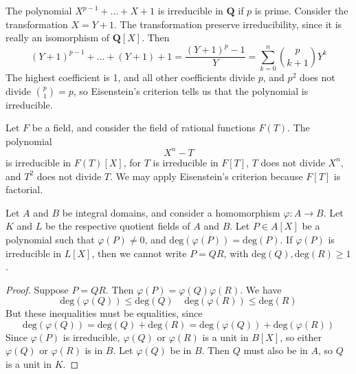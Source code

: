 \begin{example}
    The polynomial $X^{p-1} + \dots + X + 1$ is irreducible in $\mathbf{Q}$ if $p$ is prime. Consider the transformation $X = Y + 1$. The transformation preserve irreducibility, since it is really an isomorphism of $\mathbf{Q}[X]$. Then
    \[ (Y + 1)^{p-1} + \dots + (Y + 1) + 1 = \frac{(Y + 1)^p - 1}{Y} = \sum_{k = 0}^n \binom{p}{k+1} Y^k \]
    The highest coefficient is 1, and all other coefficients divide $p$, and $p^2$ does not divide $\binom{p}{1} = p$, so Eisenstein's criterion tells us that the polynomial is irreducible.
\end{example}

\begin{example}
    Let $F$ be a field, and consider the field of rational functions $F(T)$. The polynomial
    \[ X^n - T \]
    is irreducible in $F(T)[X]$, for $T$ is irreducible in $F[T]$, $T$ does not divide $X^n$, and $T^2$ does not divide $T$. We may apply Eisenstein's criterion because $F[T]$ is factorial.
\end{example}

\begin{theorem}
    Let $A$ and $B$ be integral domains, and consider a homomorphism $\varphi:A \to B$. Let $K$ and $L$ be the respective quotient fields of $A$ and $B$. Let $P \in A[X]$ be a polynomial such that $\varphi(P) \neq 0$, and $\text{deg}(\varphi(P)) = \text{deg}(P)$. If $\varphi(P)$ is irreducible in $L[X]$, then we cannot write $P = QR$, with $\text{deg}(Q), \text{deg}(R) \geq 1$.
\end{theorem}
\begin{proof}
    Suppose $P = QR$. Then $\varphi(P) = \varphi(Q) \varphi(R)$. We have
    \[ \text{deg}(\varphi(Q)) \leq \text{deg}(Q)\ \ \ \ \ \text{deg}(\varphi(R)) \leq \text{deg}(R) \]
    But these inequalities must be equalities, since
    \[ \text{deg}(\varphi(Q)) = \text{deg}(Q) + \text{deg}(R) = \text{deg}(\varphi(Q)) + \text{deg}(\varphi(R)) \]
    Since $\varphi(P)$ is irreducible, $\varphi(Q)$ or $\varphi(R)$ is a unit in $B[X]$, so either $\varphi(Q)$ or $\varphi(R)$ is in $B$. Let $\varphi(Q)$ be in $B$. Then $Q$ must also be in $A$, so $Q$ is a unit in $K$.
\end{proof}

